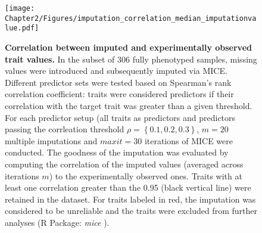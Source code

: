 \begin{figure}[hbtp]
	\centering
	\texttt{[image: Chapter2/Figures/imputation\_correlation\_median\_imputationvalue.pdf]}
	\caption[Correlation between imputed and experimentally observed trait values]{\textbf{Correlation between imputed and experimentally observed trait values.} In the subset of 306 fully phenotyped samples, missing values were introduced and subsequently imputed via MICE. Different predictor sets were tested based on Spearman's rank correlation coefficient: traits were considered predictors if their correlation with the target trait was greater than a given threshold. For each predictor setup (all traits as predictors and predictors passing the corrleation threshold \(\rho =\left\{0.1, 0.2, 0.3\right\}\),   \(m=20\) multiple imputations and \(maxit=30\) iterations of MICE were conducted. The goodness of the imputation was evaluated by computing the correlation of the imputed values (averaged across iterations \(m\)) to the experimentally observed ones. Traits with at least one correlation greater than the 0.95 (black vertical line) were retained in the dataset. For traits labeled in red, the imputation was considered to be unreliable and the traits were excluded from further analyses (R Package: \emph{mice} \citep{vanBuuren2011}).}
 	\label{fig:mice}
\end{figure}


